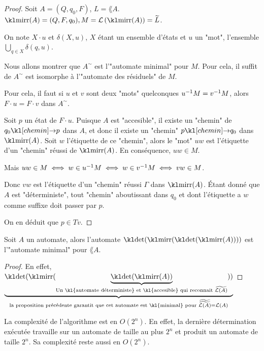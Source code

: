 \begin{proof}
	Soit $A = (Q, q_0, F)$, $L = \lang A$. $\mirr (A) = (Q, F, q_0), M = \lang {\mirr (A)} = \mirror L$.

	On note $X \cdot u$ et $\delta (X,u)$, $X$ étant un ensemble d'états et $u$ un "mot", l'ensemble $\bigcup\limits_{q \in X} \delta (q,u)$.

	Nous allons montrer que $A^{\sim}$ est l'"automate minimal" pour $M$. Pour cela, il suffit de \mq $A^{\sim}$
	est isomorphe à l'"automate des résiduels" de $M$.

	Pour cela, il faut \mq si $u$ et $v$ sont deux "mots" quelconques \tq $u^{-1} M = v^{-1} M$, alors $F \cdot u =  F \cdot v$ dans $A^{\sim}$.

	Soit $p$ un état de $F \cdot u$. Puisque $A$ est "accesible", il existe un "chemin" de $q_0 \cheminD p$ dans $A$, et donc il existe un "chemin" $p \cheminD q_0$ dans $\mirr(A)$.
	Soit $w$ l'étiquette de ce "chemin", alors le "mot" $uw$ est l'étiquette d'un "chemin" réussi de $\mirr (A)$. En conséquence, $uw \in M$.

	Mais $uw\in M \iff w \in u^{-1} M \iff w\in v^{-1} M \iff vw \in M$.

	Donc $vw$ est l'étiquette d'un "chemin" réussi $\Gamma$ dans $\mirr (A)$. Étant donné que $A$ est "déterministe", tout "chemin" aboutissant dans $q_0$
	et dont l'étiquette a $w$ comme suffixe doit passer par $p$.

	On en  déduit que $p \in Tv$.
\end{proof}


\begin{coro}
	Soit $A$ un automate, alors l'automate $\detA (\mirr (\detA(\mirr (A))))$ est l'"automate minimal" pour $\lang A$.
\end{coro}

\begin{proof}
	En effet,
	$\underbrace{\detA (\mirr (
			\underbrace{\detA(\mirr (A))}_{\text{Un \kl{automate déterministe} et \kl{accesible} qui reconnait }\mirror {\lang A}}
			))}_{\text{la proposition précédente garantit que cet automate est \kl{minimal} pour }  \mirror{\mirror {\lang A} } = \lang A} $
\end{proof}

\begin{complexite}
	La complexité de l'algorithme est en $O(2^n)$. En effet, la dernière détermination exécutée travaille sur un automate de taille au plus $2^n$
	et produit un automate de taille $2^n$. Sa complexité reste aussi en $O(2^n)$.
\end{complexite}


